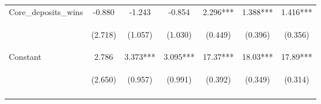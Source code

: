 \documentclass[]{article}
\begin{document}
\begin{center}
\begin{tabular}{lcccccc}
Core\_deposits\_wins & -0.880 & -1.243 & -0.854 & 2.296*** & 1.388*** & 1.416*** \\
\vspace{4pt} & \begin{footnotesize}(2.718)\end{footnotesize} & \begin{footnotesize}(1.057)\end{footnotesize} & \begin{footnotesize}(1.030)\end{footnotesize} & \begin{footnotesize}(0.449)\end{footnotesize} & \begin{footnotesize}(0.396)\end{footnotesize} & \begin{footnotesize}(0.356)\end{footnotesize} \\
Constant & 2.786 & 3.373*** & 3.095*** & 17.37*** & 18.03*** & 17.89*** \\
 & \begin{footnotesize}(2.650)\end{footnotesize} & \begin{footnotesize}(0.957)\end{footnotesize} & \begin{footnotesize}(0.991)\end{footnotesize} & \begin{footnotesize}(0.392)\end{footnotesize} & \begin{footnotesize}(0.349)\end{footnotesize} & \begin{footnotesize}(0.314)\end{footnotesize} \\
\vspace{4pt} & \begin{footnotesize}\end{footnotesize} & \begin{footnotesize}\end{footnotesize} & \begin{footnotesize}\end{footnotesize} & \begin{footnotesize}\end{footnotesize} & \begin{footnotesize}\end{footnotesize} & \begin{footnotesize}\end{footnotesize} \\

\end{tabular}
\end{center}
\end{document}
